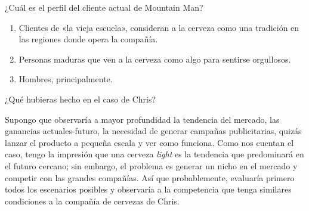 
\begin{problema}
	¿Cuál es el perfil del cliente actual de Mountain Man?
\end{problema}

\begin{sol}
	\begin{enumerate}
		\item Clientes de «la vieja escuela», consideran a la cerveza como una tradición en las regiones donde opera la compañía.
		\item Personas maduras que ven a la cerveza como algo para sentirse orgullosos. 
		\item Hombres, principalmente.  
	\end{enumerate}
\end{sol}



\begin{problema}
	¿Qué hubieras hecho en el caso de Chris?
\end{problema}
\begin{sol}
	Supongo que observaría a mayor profundidad la tendencia del mercado, las ganancias actuales-futuro, la necesidad de generar campañas publicitarias, quizás lanzar el producto a pequeña escala y ver como funciona. Como nos cuentan el caso, tengo la impresión que una cerveza \textit{light} es la tendencia que predominará en el futuro cercano; sin embargo, el problema es generar un nicho en el mercado y competir con las grandes compañías. Así que probablemente, evaluaría primero todos los escenarios posibles y observaría a la competencia que tenga similares condiciones a la compañía de cervezas de Chris. 

\end{sol}
%
%

